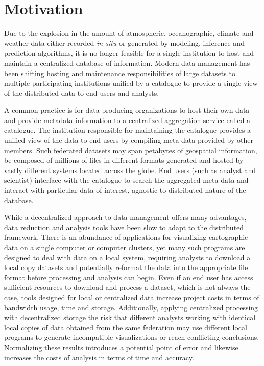 \section{Motivation}
\label{sec:motivation}
Due to the explosion in the amount of atmospheric, oceanographic,
climate and weather data either recorded \emph{in-situ} or generated
by modeling, inference and prediction algorithms, it is no longer
feasible for a single institution to host and maintain a centralized
database of information. Modern data management has been shifting
hosting and maintenance responsibilities of large datasets to multiple
participating institutions unified by a catalogue to provide a single
view of the distributed data to end users and analysts.

A common practice is for data producing organizations to host their
own data and provide metadata information to a centralized aggregation
service called a catalogue. The institution responsible for
maintaining the catalogue provides a unified view of the data to end
users by compiling meta data provided by other members. Such federated
datasets may span petabytes of geospatial information, be composed of
millions of files in different formats generated and hosted by vastly
different systems located across the globe. End users (such as analyst
and scientist) interface with the catalogue to search the aggregated
meta data and interact with particular data of interest, agnostic to
distributed nature of the database.

While a decentralized approach to data management offers many
advantages, data reduction and analysis tools have been slow to adapt
to the distributed framework. There is an abundance of
applications for visualizing cartographic data on a single computer or
computer clusters, yet many such programs are designed to deal with
data on a local system, requiring analysts to download a local copy
datasets and potentially reformat the data into the appropriate file
format before processing and analysis can begin. Even if an end user
has access sufficient resources to download and process a dataset,
which is not always the case, tools designed for local or centralized
data increase project costs in terms of bandwidth usage, time and
storage. Additionally, applying centralized processing with
decentralized storage the risk that different analysts working with
identical local copies of data obtained from the same federation may
use different local programs to generate incompatible visualizations
or reach conflicting conclusions. Normalizing these results introduces
a potential point of error and likewise increases the costs of
analysis in terms of time and accuracy.

